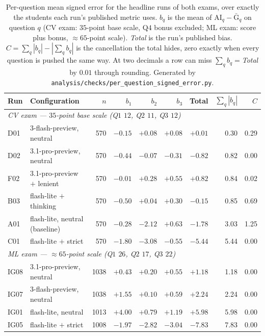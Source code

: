 \begin{table}[t]
\centering
\caption{Per-question mean signed error for the headline runs of both exams, over exactly the students each run's published metric uses. $b_q$ is the mean of $\mathrm{AI}_q - \bar{\mathrm{G}}_q$ on question $q$ (CV exam: $35$-point base scale, Q$4$ bonus excluded; ML exam: score plus bonus, $\approx 65$-point scale). \emph{Total} is the run's published bias. $C = \sum_q |b_q| - |\sum_q b_q|$ is the cancellation the total hides, zero exactly when every question is pushed the same way. At two decimals a row can miss $\sum_q b_q = {}$\emph{Total} by $0.01$ through rounding. Generated by \texttt{analysis/checks/per\_question\_signed\_error.py}.}
\label{tab:perqbias}
\small
\setlength{\tabcolsep}{4.5pt}
\begin{tabular}{llrrrrrrr}
\toprule
Run & Configuration & $n$ & $b_1$ & $b_2$ & $b_3$ & Total & $\sum_q |b_q|$ & $C$ \\
\midrule
\multicolumn{9}{l}{\emph{CV exam --- $35$-point base scale (Q$1$ $12$, Q$2$ $11$, Q$3$ $12$)}} \\
D01 & 3-flash-preview, neutral        & 570 & $-0.15$ & $+0.08$ & $+0.08$ & $+0.01$ & 0.30 & 0.29 \\
D02 & 3.1-pro-preview, neutral        & 570 & $-0.44$ & $-0.07$ & $-0.31$ & $-0.82$ & 0.82 & 0.00 \\
F02 & 3.1-pro-preview $+$ lenient     & 570 & $-0.01$ & $+0.28$ & $+0.55$ & $+0.82$ & 0.84 & 0.02 \\
B03 & flash-lite $+$ thinking         & 570 & $-0.50$ & $+0.04$ & $+0.30$ & $-0.15$ & 0.85 & 0.69 \\
A01 & flash-lite, neutral (baseline)  & 570 & $-0.28$ & $-2.12$ & $+0.63$ & $-1.78$ & 3.03 & 1.25 \\
C01 & flash-lite $+$ strict           & 570 & $-1.80$ & $-3.08$ & $-0.55$ & $-5.44$ & 5.44 & 0.00 \\
\midrule
\multicolumn{9}{l}{\emph{ML exam --- $\approx 65$-point scale (Q$1$ $26$, Q$2$ $17$, Q$3$ $22$)}} \\
IG08 & 3.1-pro-preview, neutral       & 1038 & $+0.43$ & $+0.20$ & $+0.55$ & $+1.18$ & 1.18 & 0.00 \\
IG07 & 3-flash-preview, neutral       & 1038 & $+1.55$ & $+0.10$ & $+0.59$ & $+2.24$ & 2.24 & 0.00 \\
IG01 & flash-lite, neutral            & 1013 & $+4.00$ & $+0.79$ & $+1.19$ & $+5.98$ & 5.98 & 0.00 \\
IG05 & flash-lite $+$ strict          & 1008 & $-1.97$ & $-2.82$ & $-3.04$ & $-7.83$ & 7.83 & 0.00 \\
\bottomrule
\end{tabular}
\end{table}

